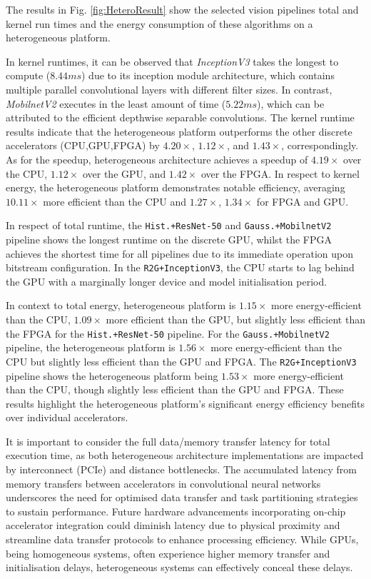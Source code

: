 \documentclass[]{spie}  %
\begin{document}
The results in Fig. \ref{fig:HeteroResult} show the selected vision pipelines total and kernel run times and the energy consumption of these algorithms on a heterogeneous platform.

In kernel runtimes, it can be observed that \textit{InceptionV3} takes the longest to compute ($8.44ms$) due to its inception module architecture, which contains multiple parallel convolutional layers with different filter sizes. In contrast, \textit{MobilnetV2} executes in the least amount of time ($5.22ms$), which can be attributed to the efficient depthwise separable convolutions. The kernel runtime results indicate that the heterogeneous platform outperforms the other discrete accelerators (CPU,GPU,FPGA) by $4.20\times$, $1.12\times$, and $1.43\times$, correspondingly.  As for the speedup, heterogeneous architecture achieves a speedup of \(4.19\times\) over the CPU, \(1.12\times\) over the GPU, and \(1.42\times\) over the FPGA. In respect to kernel energy, the heterogeneous platform demonstrates notable efficiency, averaging \(10.11\times\) more efficient than the CPU and \(1.27\times\), \(1.34\times\) for FPGA and GPU.

In respect of total runtime, the \texttt{Hist.+ResNet-50} and \texttt{Gauss.+MobilnetV2} pipeline shows the longest runtime on the discrete GPU, whilst the FPGA achieves the shortest time for all pipelines due to its immediate operation upon bitstream configuration. In the \texttt{R2G+InceptionV3}, the CPU starts to lag behind the GPU with a marginally longer device and model initialisation period. 

In context to total energy, heterogeneous platform is \(1.15\times\) more energy-efficient than the CPU, \(1.09\times\) more efficient than the GPU, but slightly less efficient than the FPGA for the \texttt{Hist.+ResNet-50} pipeline. For the \texttt{Gauss.+MobilnetV2} pipeline, the heterogeneous platform is \(1.56\times\) more energy-efficient than the CPU but slightly less efficient than the GPU and FPGA. The \texttt{R2G+InceptionV3} pipeline shows the heterogeneous platform being \(1.53\times\) more energy-efficient than the CPU, though slightly less efficient than the GPU and FPGA. These results highlight the heterogeneous platform's significant energy efficiency benefits over individual accelerators.


It is important to consider the full data/memory transfer latency for total execution time, as both heterogeneous architecture implementations are impacted by interconnect (PCIe) and distance bottlenecks. The accumulated latency from memory transfers between accelerators in convolutional neural networks underscores the need for optimised data transfer and task partitioning strategies to sustain performance. Future hardware advancements incorporating on-chip accelerator integration could diminish latency due to physical proximity and streamline data transfer protocols to enhance processing efficiency. While GPUs, being homogeneous systems, often experience higher memory transfer and initialisation delays, heterogeneous systems can effectively conceal these delays. 
\end{document}
